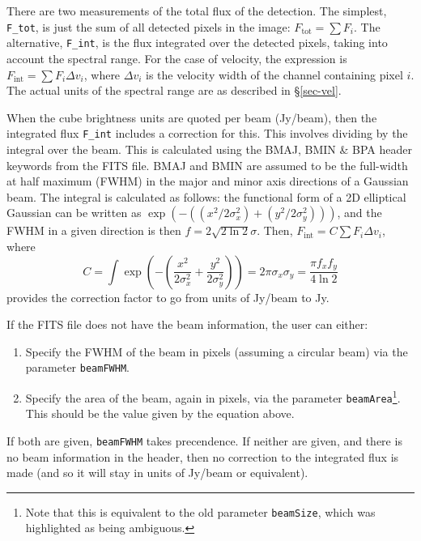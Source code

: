 \label{sec-fluxparams}


There are two measurements of the total flux of the detection. The
simplest, \texttt{F\_tot}, is just the sum of all detected pixels in
the image: $F_\text{tot}=\sum F_i$. The alternative, \texttt{F\_int},
is the flux integrated over the detected pixels, taking into account
the spectral range. For the case of velocity, the expression is
$F_\text{int} = \sum F_i \Delta v_i$, where $\Delta v_i$ is the
velocity width of the channel containing pixel $i$. The actual units
of the spectral range are as described in \S\ref{sec-vel}.

When the cube brightness units are quoted per beam (\eg Jy/beam), then
the integrated flux \texttt{F\_int} includes a correction for
this. This involves dividing by the integral over the beam. This is
calculated using the BMAJ, BMIN \& BPA header keywords from the FITS
file. BMAJ and BMIN are assumed to be the full-width at half maximum
(FWHM) in the major and minor axis directions of a Gaussian beam. The
integral is calculated as follows: the functional form of a 2D
elliptical Gaussian can be written as
$\exp(-((x^2/2\sigma_x^2)+(y^2/2\sigma_y^2)))$, and the FWHM in a
given direction is then $f=2\sqrt{2\ln2}\sigma$. Then, $F_\text{int} =
C \sum F_i \Delta v_i$, where 
\[
C = \int\exp\left(-\left(\frac{x^2}{2\sigma_x^2}+\frac{y^2}{2\sigma_y^2}\right)\right)
= 2\pi\sigma_x\sigma_y
=\frac{\pi f_x f_y}{4\ln2}
\]
provides the correction factor to go from units of Jy/beam to Jy.

If the FITS file does not have the beam information, the user can
either:
\begin{enumerate}
\item Specify the FWHM of the beam in pixels (assuming a circular
  beam) via the parameter \texttt{beamFWHM}.
\item Specify the area of the beam, again in pixels, via the parameter
  \texttt{beamArea}\footnote{Note that this is equivalent to the old
    parameter \texttt{beamSize}, which was highlighted as being
    ambiguous.}. This should be the value given by the equation above.
\end{enumerate}
If both are given, \texttt{beamFWHM} takes precendence. If neither are
given, and there is no beam information in the header, then no
correction to the integrated flux is made (and so it will stay in
units of Jy/beam or equivalent).

